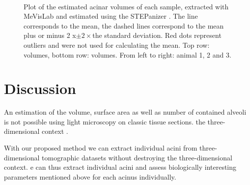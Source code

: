 \documentclass[final,paper=a4,DIV=calc,abstract,english]{scrartcl}
\newcommand{\imsize}{\linewidth}
\newcommand{\biggerthan}{2\xspace} %
\begin{document}
\renewcommand{\imsize}{0.35\textwidth}
\begin{figure}[htb]
	\centering
	\subfloat{
		}\hfill%
	\subfloat{
		
		}\hfill%
	\subfloat{
		
		}\\%
	\subfloat{
		
		}\hfill%
	\subfloat{
		
		}\hfill%
	\subfloat{
		
		}%
	\caption{Plot of the estimated acinar volumes of each sample, extracted with MeVisLab  and estimated using the STEPanizer .
		The line corresponds to the mean, the dashed lines correspond to the mean \ifJCS plus or minus \biggerthan x\xspace\else\(\pm\biggerthan\times\)\xspace\fi the standard deviation.
		Red dots represent outliers and were not used for calculating the mean.
		Top row:  volumes, bottom row:  volumes.
		From left to right: animal 1, 2 and 3.}
	\label{fig:Volume plots}
\end{figure}

\section{Discussion}\label{sec:discussion}

An estimation of the volume,  surface area as well as  number of contained alveoli   is not possible using light microscopy on classic tissue sections.
 the three-dimensional context .

With our proposed method we can extract individual acini from three-dimensional tomographic datasets without destroying the three-dimensional context.
e can thus extract individual acini and assess  biologically interesting parameters mentioned above for each acinus individually.
\end{document}
